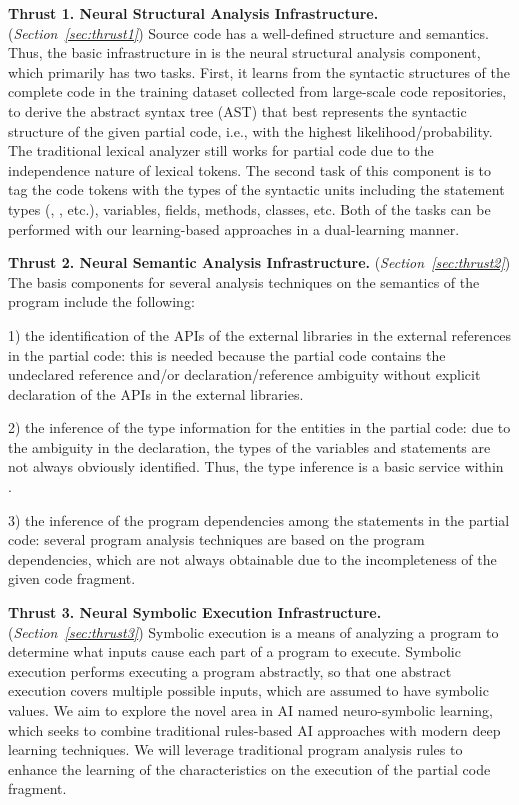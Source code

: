 \noindent \textbf{Thrust 1. Neural Structural Analysis Infrastructure.} ({\em Section~\ref{sec:thrust1}}) Source code has a well-defined structure and semantics. Thus, the basic infrastructure in {\tool} is the neural structural analysis component, which primarily has two tasks. First, it learns from the syntactic structures of the complete code in the training dataset collected from large-scale code repositories, to derive the abstract syntax tree (AST) that best represents the syntactic structure of the given partial code, i.e., with the highest likelihood/probability. The traditional lexical analyzer still works for partial code due to the independence nature of lexical tokens. The second task of this component is to tag the code tokens with the types of the syntactic units including the statement types (, , etc.), variables, fields, methods, classes, etc. Both of the tasks can be performed with our learning-based approaches in a dual-learning manner.
  
\vspace{3pt}
\noindent \textbf{Thrust 2. Neural Semantic Analysis Infrastructure.}
({\em Section~\ref{sec:thrust2}}) The basis components for several
analysis techniques on the semantics of the program include the
following:

1) the identification of the APIs of the external libraries in the
external references in the partial code: this is needed because the
partial code contains the undeclared reference and/or
declaration/reference ambiguity without explicit declaration of the
APIs in the external libraries.

2) the inference of the type information for the entities in the
partial code: due to the ambiguity in the declaration, the types of
the variables and statements are not always obviously
identified. Thus, the type inference is a basic service within
{\tool}.

3) the inference of the program dependencies among the statements in
the partial code: several program analysis techniques are based on the
program dependencies, which are not always obtainable due to the
incompleteness of the given code fragment.

\vspace{3pt}
\noindent \textbf{Thrust 3. Neural Symbolic Execution Infrastructure.}
({\em Section~\ref{sec:thrust3}})
Symbolic execution is a means of analyzing a program to determine what
inputs cause each part of a program to execute. Symbolic execution
performs executing a program abstractly, so that one abstract
execution covers multiple possible inputs, which are assumed to have
symbolic values. We aim to explore the novel area in AI named
neuro-symbolic learning, which seeks to combine traditional
rules-based AI approaches with modern deep learning techniques.  We
will leverage traditional program analysis rules to enhance the
learning of the characteristics on the execution of the partial code
fragment.

